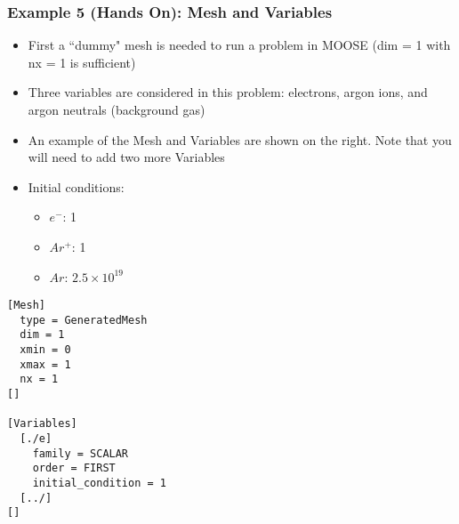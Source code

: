 \begin{frame}[fragile]
	\frametitle{Example 5 (Hands On): Mesh and Variables}
	\begin{minipage}{0.6\linewidth}
	\begin{itemize}
		\item First a ``dummy" mesh is needed to run a problem in MOOSE (dim = 1 with nx = 1 is sufficient)
		\item Three variables are considered in this problem: electrons, argon ions, and argon neutrals (background gas)
		\item An example of the Mesh and Variables are shown on the right. Note that you will need to add two more Variables
		\item Initial conditions:
		\begin{itemize}
			\item $e^-$: 1
			\item $Ar^+$: 1
			\item $Ar$: $2.5 \times 10^{19}$
		\end{itemize}
	\end{itemize}
	\end{minipage}%
	\begin{minipage}{0.4\linewidth}
	\begin{scriptsize}
	\begin{BVerbatim}
[Mesh]
  type = GeneratedMesh
  dim = 1
  xmin = 0
  xmax = 1
  nx = 1
[]

[Variables]
  [./e]
    family = SCALAR
    order = FIRST
    initial_condition = 1
  [../]
[]
	\end{BVerbatim}
	\end{scriptsize}
	\end{minipage}
\end{frame}

